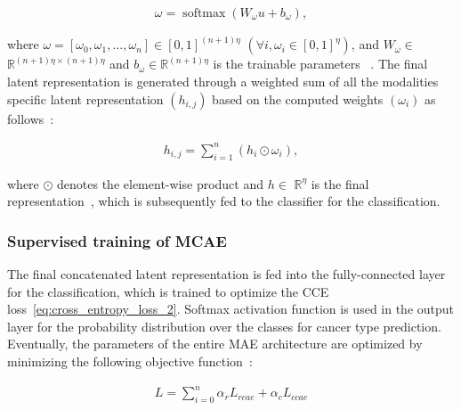 \vspace{-6mm}
\begin{align}
    \omega=\operatorname{softmax}\left(W_{\omega} u+b_{\omega}\right),
\end{align}

\hspace*{3.5mm} where $\omega=\left[\omega_{0}, \omega_{1}, \ldots, \omega_{n}\right] \in[0,1]^{(n+1) \eta}$ $\left(\forall i, \omega_{i} \in[0,1]^{\eta}\right)$, and  $W_{\omega} \in$ $\mathbb{R}^{(n+1) \eta \times(n+1) \eta}$ and $b_{\omega} \in \mathbb{R}^{(n+1) \eta}$ is the trainable parameters ~\cite{mmdcae}. The final latent representation is generated through a weighted sum of all the modalities specific latent representation $\left(h_{i,j}\right)$ based on the computed weights $\left(\omega_{i}\right)$ as follows~\cite{mmdcae}: 

\vspace{-6mm}
\begin{align}
   h_{i,j}=\sum_{i=1}^{n}\left(h_{i} \odot \omega_{i}\right),
   \label{eq:mcae_latent_final}
\end{align}

\hspace*{3.5mm} where $\odot$ denotes the element-wise product and $h \in$ $\mathbb{R}^{\eta}$ is the final representation~\cite{mmdcae}, which is subsequently fed to the classifier for the classification. 

\subsubsection{Supervised training of MCAE}
The final concatenated latent representation is fed into the fully-connected layer for the classification, which is trained to optimize the CCE loss~\cref{eq:cross_entropy_loss_2}. Softmax activation function is used in the output layer for the probability distribution over the classes for cancer type prediction. Eventually, the parameters of the entire MAE  architecture are optimized by minimizing the following objective function~\cite{mmdcae}:

\vspace{-4mm}
\begin{align}
    {L}=\sum_{i=0}^{n} \alpha_{r} {L}_{rcae}+\alpha_{c} {L}_{ccae}
    \label{eq:sum_2}
\end{align}

